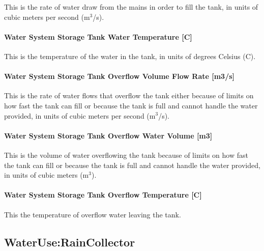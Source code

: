 This is the rate of water draw from the mains in order to fill the tank, in units of cubic meters per second (m\(^{3}\)/s).

\paragraph{Water System Storage Tank Water Temperature {[}C{]}}\label{water-system-storage-tank-water-temperature-c}

This is the temperature of the water in the tank, in units of degrees Celsius (C).

\paragraph{Water System Storage Tank Overflow Volume Flow Rate {[}m3/s{]}}\label{water-system-storage-tank-overflow-volume-flow-rate-m3s}

This is the rate of water flows that overflow the tank either because of limits on how fast the tank can fill or because the tank is full and cannot handle the water provided, in units of cubic meters per second (m\(^{3}\)/s).

\paragraph{Water System Storage Tank Overflow Water Volume {[}m3{]}}\label{water-system-storage-tank-overflow-water-volume-m3}

This is the volume of water overflowing the tank because of limits on how fast the tank can fill or because the tank is full and cannot handle the water provided, in units of cubic meters (m\(^{3}\)).

\paragraph{Water System Storage Tank Overflow Temperature {[}C{]}}\label{water-system-storage-tank-overflow-temperature-c}

This the temperature of overflow water leaving the tank.

\subsection{WaterUse:RainCollector}\label{wateruseraincollector}

